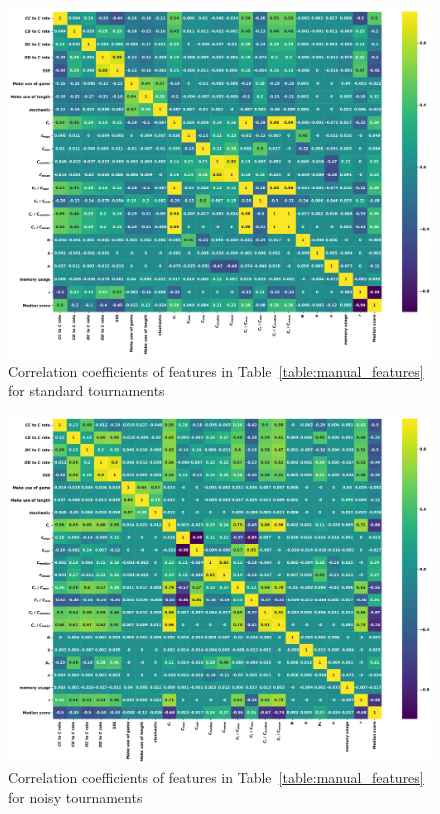 \documentclass{article}
\begin{document}
\begin{figure}[!htbp]
        \begin{center}
            \includegraphics[width=.75\linewidth]{../images/standard_correlation_plot.pdf}
        \end{center}
        \caption{Correlation coefficients of features in Table~\ref{table:manual_features}
        for standard tournaments}
\end{figure}
\begin{figure}[!htbp]
    \begin{center}
        \includegraphics[width=.75\linewidth]{../images/noise_correlation_plot.pdf}
    \end{center}
    \caption{Correlation coefficients of features in Table~\ref{table:manual_features}
    for noisy tournaments}
\end{figure}
\end{document}
